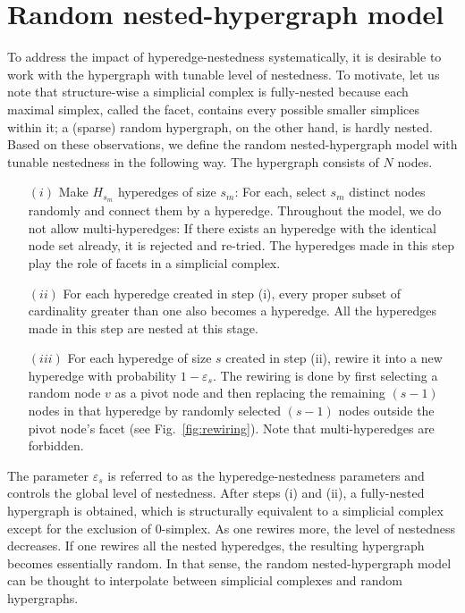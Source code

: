 \documentclass[aps,pre,twocolumn,nofootinbib,superscriptaddress,showpacs,showkeys]{revtex4-1}
\begin{document}
\section{Random nested-hypergraph model}
To address the impact of hyperedge-nestedness systematically, it is desirable to work with the hypergraph with tunable level of nestedness. To motivate, let us note that structure-wise a simplicial complex is fully-nested because each maximal simplex, called the facet, contains every possible smaller simplices within it; a (sparse) random hypergraph, on the other hand, is hardly nested. Based on these observations, we define the random nested-hypergraph model with tunable nestedness in the following way. The hypergraph consists of $N$ nodes.

\begin{itemize}
\item[$(i)$] Make $H_{s_m}$ hyperedges of size $s_m$: For each, select $s_m$ distinct nodes randomly and connect them by a hyperedge. 
Throughout the model, we do not allow multi-hyperedges: If there exists an hyperedge with the identical node set already, it is rejected and re-tried. The hyperedges made in this step play the role of facets in a simplicial complex.%

\item[$(ii)$] For each hyperedge created in step (i), every proper subset of cardinality greater than one also becomes a hyperedge. All the hyperedges made in this step are {nested} at this stage.

\item[$(iii)$] For each hyperedge of size $s$ created in step (ii), rewire it into a new hyperedge with probability $1-\varepsilon_s$. 
The rewiring is done by first selecting a random node $v$ as a pivot node and then replacing the remaining $(s-1)$ nodes in that hyperedge by randomly selected $(s-1)$ nodes outside the pivot node's facet (see Fig.~\ref{fig:rewiring}). Note that multi-hyperedges are forbidden.
\end{itemize}
The parameter $\varepsilon_s$ is referred to as the hyperedge-nestedness parameters and controls the global level of nestedness. After steps (i) and (ii), a fully-nested hypergraph is obtained, which is structurally equivalent to a simplicial complex except for the exclusion of 0-simplex. As one rewires more, the level of nestedness decreases. If one rewires all the nested hyperedges, the resulting hypergraph becomes essentially random. 
In that sense, the random nested-hypergraph model can be thought to interpolate between simplicial complexes and random hypergraphs. 
\end{document}
